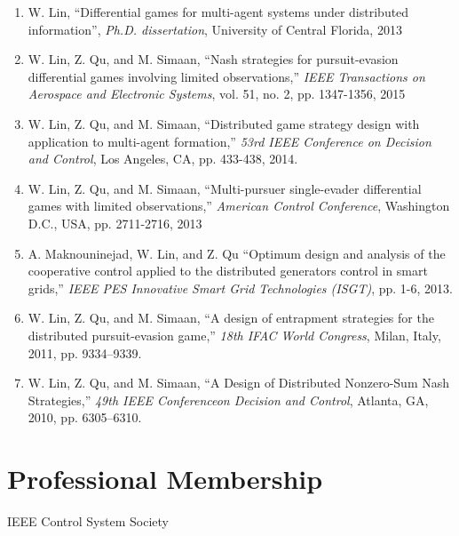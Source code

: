 \documentclass[margin,line]{res}
\newenvironment{list1}{
  \begin{list}{\ding{113}}{%
      \setlength{\itemsep}{0in}
      \setlength{\parsep}{0in} \setlength{\parskip}{0in}
      \setlength{\topsep}{0in} \setlength{\partopsep}{0in} 
      \setlength{\leftmargin}{0.17in}}}{\end{list}}
\begin{document}
\begin{resume}
\begin{enumerate}
\item W. Lin, ``Differential games for multi-agent systems under distributed information'', \emph{Ph.D. dissertation}, University of Central Florida, 2013
\vspace*{0.3cm}

\item W. Lin, Z. Qu, and M. Simaan, ``Nash strategies for pursuit-evasion differential games involving limited observations,'' \emph{IEEE Transactions on Aerospace and Electronic Systems}, vol. 51, no. 2, pp. 1347-1356, 2015
\vspace*{0.3cm}

\item W. Lin, Z. Qu, and M. Simaan, ``Distributed game strategy design with application to multi-agent formation,'' \emph{53rd IEEE Conference on Decision and Control}, Los Angeles, CA, pp. 433-438, 2014.
\vspace*{0.3cm}

\item W. Lin, Z. Qu, and M. Simaan, ``Multi-pursuer single-evader differential games with limited observations,''  \emph{American Control Conference}, Washington D.C., USA, pp. 2711-2716, 2013
\vspace*{0.3cm}

\item A. Maknouninejad, W. Lin, and Z. Qu ``Optimum design and analysis of the cooperative control applied to the distributed generators control in smart grids,'' \emph{IEEE PES Innovative Smart Grid Technologies (ISGT)}, pp. 1-6, 2013.
\vspace*{0.3cm}

\item W. Lin, Z. Qu, and M. Simaan, ``A design of entrapment strategies for the distributed pursuit-evasion game,'' \emph{18th IFAC World Congress}, Milan, Italy, 2011, pp. 9334--9339.
\vspace*{0.3cm}

\item W. Lin, Z. Qu, and M. Simaan, ``A Design of Distributed Nonzero-Sum Nash Strategies,'' \emph{49th IEEE Conferenceon Decision and Control}, Atlanta, GA, 2010, pp. 6305--6310.
\end{enumerate}

\section{\sc Professional Membership}
\begin{list1}
\item[] IEEE Control System Society
\end{list1}


\end{resume}
\end{document}
